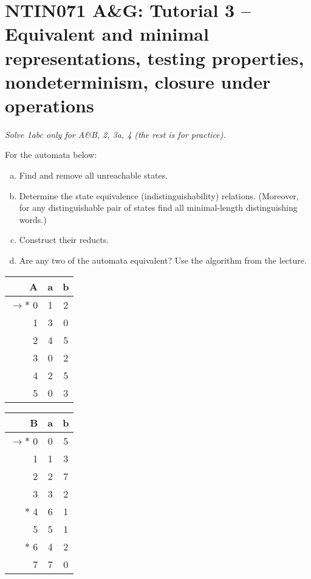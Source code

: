 \documentclass[a4paper,12pt]{amsart}
\begin{document}

\section*{NTIN071 A\&G: Tutorial 3 -- Equivalent and minimal representations, testing properties, nondeterminism, closure under operations}


\medskip

\noindent\emph{Solve 1abc only for A\&B, 2, 3a, 4 (the rest is for practice).}

\medskip


\medskip\begin{problem}    
    
    For the automata below:

    \begin{enumerate}[(a)]\setlength\itemsep{12pt}
        \item Find and remove all unreachable states.
        \item Determine the state equivalence (indistinguishability) relations. (Moreover, for any distinguishable pair of states find all minimal-length distinguishing words.)
        \item Construct their reducts.
        \item Are any two of the automata equivalent? Use the algorithm from the lecture.
    \end{enumerate}
    
    \begin{multicols}{3}
    
        \begin{tabular}{ r | c c }
            A & a & b \\ \hline
            $\to\ast$ 0 & 1 & 2 \\  
            1 & 3 & 0 \\
            2 & 4 & 5 \\
            3 & 0 & 2 \\
            4 & 2 & 5 \\
            5 & 0 & 3
        \end{tabular}
            
        \begin{tabular}{ r | c c }
            B  & a & b \\ \hline
            $\to\ast$ 0 & 0 & 5 \\  
            1 & 1 & 3 \\
            2 & 2 & 7 \\
            3 & 3 & 2 \\
            $\ast$ 4 & 6 & 1 \\
            5 & 5 & 1 \\
            $\ast$ 6 & 4 & 2 \\
            7 & 7 & 0
        \end{tabular}
                

\end{multicols}
\end{problem}
\end{document}
